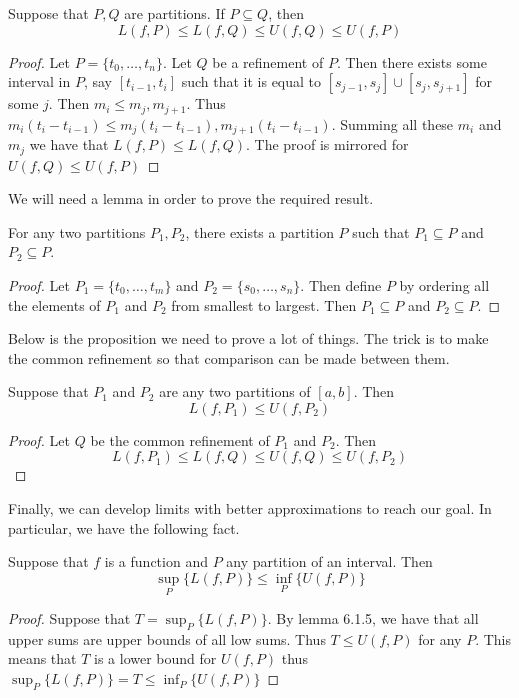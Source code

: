 \documentclass[a4paper]{article}
\begin{document}
\begin{prp}{}{} Suppose that $P,Q$ are partitions. If $P\subseteq Q$, then $$L(f,P)\leq L(f,Q)\leq U(f,Q)\leq U(f,P)$$ \tcbline
\begin{proof} Let $P=\{t_0,\dots,t_n\}$. Let $Q$ be a refinement of $P$. Then there exists some interval in $P$, say $[t_{i-1},t_i]$ such that it is equal to $[s_{j-1},s_j]\cup[s_j,s_{j+1}]$ for some $j$. Then $m_i\leq m_j,m_{j+1}$. Thus $m_i(t_i-t_{i-1})\leq m_j(t_i-t_{i-1}),m_{j+1}(t_i-t_{i-1})$. Summing all these $m_i$ and $m_j$ we have that $L(f,P)\leq L(f,Q)$. The proof is mirrored for $U(f,Q)\leq U(f,P)$
\end{proof}
\end{prp}

We will need a lemma in order to prove the required result. 

\begin{lmm}{}{} For any two partitions $P_1,P_2$, there exists a partition $P$ such that $P_1\subseteq P$ and $P_2\subseteq P$. \tcbline
\begin{proof} Let $P_1=\{t_0,\dots,t_m\}$ and $P_2=\{s_0,\dots,s_n\}$. Then define $P$ by ordering all the elements of $P_1$ and $P_2$ from smallest to largest. Then $P_1\subseteq P$ and $P_2\subseteq P$. 
\end{proof}
\end{lmm}

Below is the proposition we need to prove a lot of things. The trick is to make the common refinement so that comparison can be made between them. 

\begin{prp}{}{} Suppose that $P_1$ and $P_2$ are any two partitions of $[a,b]$. Then $$L(f,P_1)\leq U(f,P_2)$$ \tcbline
\begin{proof} Let $Q$ be the common refinement of $P_1$ and $P_2$. Then $$L(f,P_1)\leq L(f,Q)\leq U(f,Q)\leq U(f,P_2)$$
\end{proof}
\end{prp}

Finally, we can develop limits with better approximations to reach our goal. In particular, we have the following fact. 

\begin{lmm}{}{} Suppose that $f$ is a function and $P$ any partition of an interval. Then $$\sup_P\{L(f,P)\}\leq\inf_P\{U(f,P)\}$$ \tcbline
\begin{proof} Suppose that $T=\sup_P\{L(f,P)\}$. By lemma 6.1.5, we have that all upper sums are upper bounds of all low sums. Thus $T\leq U(f,P)$ for any $P$. This means that $T$ is a lower bound for $U(f,P)$ thus $\sup_P\{L(f,P)\}=T\leq\inf_P\{U(f,P)\}$
\end{proof}
\end{lmm}
\end{document}
